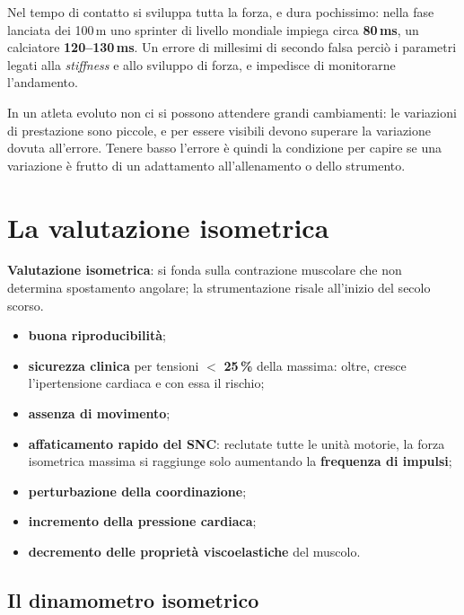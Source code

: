 Nel tempo di contatto si sviluppa tutta la forza, e dura pochissimo: nella fase lanciata
dei 100\,m uno sprinter di livello mondiale impiega circa \textbf{80\,ms}, un calciatore
\textbf{120--130\,ms}. Un errore di millesimi di secondo falsa perciò i parametri legati alla
\textit{stiffness} e allo sviluppo di forza, e impedisce di monitorarne l'andamento.

In un atleta evoluto non ci si possono attendere grandi cambiamenti: le variazioni di prestazione
  sono piccole, e per essere visibili devono superare la variazione dovuta all'errore. Tenere basso
  l'errore è quindi la condizione per capire se una variazione è frutto di un adattamento
  all'allenamento o dello strumento.

\section{La valutazione isometrica}

\textbf{Valutazione isometrica}: si fonda sulla contrazione muscolare che non determina spostamento
  angolare; la strumentazione risale all'inizio del secolo scorso.

\begin{itemize}
  \item \textbf{buona riproducibilità};
  \item \textbf{sicurezza clinica} per tensioni $<$ \textbf{25\,\%} della massima: oltre,
    cresce l'ipertensione cardiaca e con essa il rischio;
  \item \textbf{assenza di movimento};
  \item \textbf{affaticamento rapido del SNC}: reclutate tutte le unità motorie, la forza isometrica
    massima si raggiunge solo aumentando la \textbf{frequenza di impulsi};
  \item \textbf{perturbazione della coordinazione};
  \item \textbf{incremento della pressione cardiaca};
  \item \textbf{decremento delle proprietà viscoelastiche} del muscolo.
\end{itemize}

\subsection{Il dinamometro isometrico}

